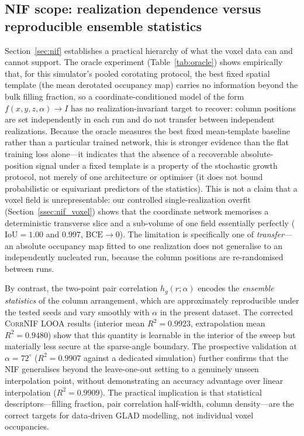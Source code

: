 \documentclass[aip,amsmath,amssymb,reprint]{revtex4-1}
\newcommand{\dang}{\ensuremath{\alpha}}
\begin{document}
\subsection{NIF scope: realization dependence versus reproducible ensemble statistics}
\label{ssec:nif_scope}

Section~\ref{sec:nif} establishes a practical hierarchy of what the
voxel data can and cannot support.
The oracle experiment (Table~\ref{tab:oracle}) shows empirically that,
for this simulator's pooled corotating protocol, the best fixed spatial
template (the mean derotated occupancy map) carries no information beyond
the bulk filling fraction, so a coordinate-conditioned model of the form
$f(x, y, z, \dang) \to I$ has no realization-invariant target to recover:
column positions are set independently in each run and do not transfer
between independent realizations.
Because the oracle measures the best fixed mean-template baseline rather
than a particular trained network, this is stronger evidence than the
flat training loss alone---it indicates that the absence of a recoverable
absolute-position signal under a fixed template is a property of the
stochastic growth protocol, not merely of one architecture or optimiser
(it does not bound probabilistic or equivariant predictors of the
statistics).
This is not a claim that a voxel field is unrepresentable: our controlled
single-realization overfit (Section~\ref{ssec:nif_voxel}) shows that the
coordinate network memorises a deterministic transverse slice and a
sub-volume of one field essentially perfectly
($\mathrm{IoU} = 1.00$ and $0.997$, $\mathrm{BCE}\to 0$).  The limitation is
specifically one of \emph{transfer}---an absolute occupancy map fitted to
one realization does not generalise to an independently nucleated run,
because the column positions are re-randomised between runs.

By contrast, the two-point pair correlation $h_g(r;\dang)$ encodes
the \textit{ensemble statistics} of the column arrangement, which are
approximately reproducible under the tested seeds and vary smoothly with
$\dang$ in the present dataset.
The corrected \textsc{CorrNIF} LOOA results (interior mean
$R^2 = 0.9923$, extrapolation mean $R^2 = 0.9480$) show that this quantity
is learnable in the interior of the sweep but materially less secure at the
sparse-angle boundary.
The prospective validation at $\dang = 72^{\circ}$ ($R^2 = 0.9907$
against a dedicated simulation) further confirms that the NIF generalises
beyond the leave-one-out setting to a genuinely unseen interpolation point,
without demonstrating an accuracy advantage over linear interpolation
($R^2 = 0.9909$).
The practical implication is that statistical descriptors---filling
fraction, pair correlation half-width, column density---are the correct
targets for data-driven GLAD modelling, not individual voxel occupancies.
\end{document}
